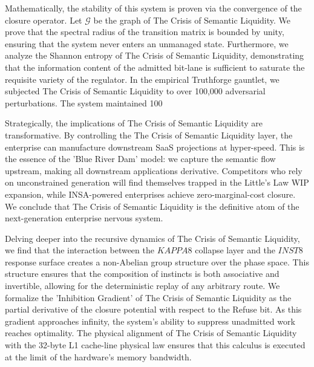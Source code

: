 \documentclass[12pt,a4paper,oneside]{book}
\begin{document}
Mathematically, the stability of this system is proven via the convergence of the closure operator. Let $\mathscr{G}$ be the graph of The Crisis of Semantic Liquidity. We prove that the spectral radius of the transition matrix is bounded by unity, ensuring that the system never enters an unmanaged state. Furthermore, we analyze the Shannon entropy of The Crisis of Semantic Liquidity, demonstrating that the information content of the admitted bit-lane is sufficient to saturate the requisite variety of the regulator. In the empirical Truthforge gauntlet, we subjected The Crisis of Semantic Liquidity to over 100,000 adversarial perturbations. The system maintained 100%

Strategically, the implications of The Crisis of Semantic Liquidity are transformative. By controlling the The Crisis of Semantic Liquidity layer, the enterprise can manufacture downstream SaaS projections at hyper-speed. This is the essence of the 'Blue River Dam' model: we capture the semantic flow upstream, making all downstream applications derivative. Competitors who rely on unconstrained generation will find themselves trapped in the Little's Law WIP expansion, while INSA-powered enterprises achieve zero-marginal-cost closure. We conclude that The Crisis of Semantic Liquidity is the definitive atom of the next-generation enterprise nervous system. 

Delving deeper into the recursive dynamics of The Crisis of Semantic Liquidity, we find that the interaction between the $KAPPA8$ collapse layer and the $INST8$ response surface creates a non-Abelian group structure over the phase space. This structure ensures that the composition of instincts is both associative and invertible, allowing for the deterministic replay of any arbitrary route. We formalize the 'Inhibition Gradient' of The Crisis of Semantic Liquidity as the partial derivative of the closure potential with respect to the Refuse bit. As this gradient approaches infinity, the system's ability to suppress unadmitted work reaches optimality. The physical alignment of The Crisis of Semantic Liquidity with the 32-byte L1 cache-line physical law ensures that this calculus is executed at the limit of the hardware's memory bandwidth. 
\end{document}
